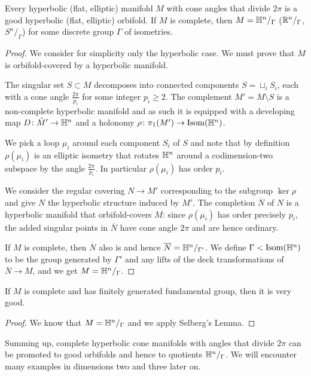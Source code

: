 \begin{prop} \label{from:cone:to:orbifold:prop}
Every hyperbolic (flat, elliptic) manifold $M$ with cone angles that divide $2\pi$ is a good hyperbolic (flat, elliptic) orbifold. If $M$ is complete, then $M=\mathbb{H}^n/_\Gamma$ ($\mathbb{R}^n/_\Gamma$, $S^n/_\Gamma$) for some discrete group $\Gamma$ of isometries.
\end{prop}
\begin{proof}
We consider for simplicity only the hyperbolic case. We must prove that $M$ is orbifold-covered by a hyperbolic manifold.

The singular set $S\subset M$ decomposes into connected components $S = \sqcup_i S_i$, each with a cone angle $\frac{2\pi}{p_i}$ for some integer $p_i \geqslant 2$. The complement $M' = M \setminus S$ is a non-complete hyperbolic manifold and as such it is equipped with a developing map $D\colon \tilde M' \to \mathbb{H}^n$ and a holonomy $\rho\colon \pi_1(M') \to {\rm Isom}(\mathbb{H}^n)$. 

We pick a loop $\mu_i$ around each component $S_i$ of $S$ and note that by definition $\rho(\mu_i)$ is an elliptic isometry that rotates $\mathbb{H}^n$ around a codimension-two subspace by the angle $\frac{2\pi}{p_i}$. In particular $\rho(\mu_i)$ has order $p_i$. 

We consider the regular covering $N \to M'$ corresponding to the subgroup $\ker \rho$ and give $N$ the hyperbolic structure induced by $M'$. The completion $\overline N$ of $N$ is a hyperbolic manifold that orbifold-covers $M$: since $\rho(\mu_i)$ has order precisely $p_i$, the added singular points in $\overline N$ have cone angle $2\pi$ and are hence ordinary. 

If $M$ is complete, then $\overline N$ also is and hence $\overline N = \mathbb{H}^n/_{\Gamma'}$. We define $\Gamma<{\rm Isom}(\mathbb{H}^n)$ to be the group generated by $\Gamma'$ and any lifts of the deck transformations of $\overline N\to M$, and we get $M=\mathbb{H}^n/_\Gamma$.
\end{proof}

\begin{cor} \label{very:good:cor}
If $M$ is complete and has finitely generated fundamental group, then it is very good. 
\end{cor}
\begin{proof}
We know that $M=\mathbb{H}^n/_\Gamma$ and we apply Selberg's Lemma.
\end{proof}

Summing up, complete hyperbolic cone manifolds with angles that divide $2\pi$ can be promoted to good orbifolds and hence to quotients $\mathbb{H}^n/_\Gamma$. We will encounter many examples in dimensions two and three later on.

